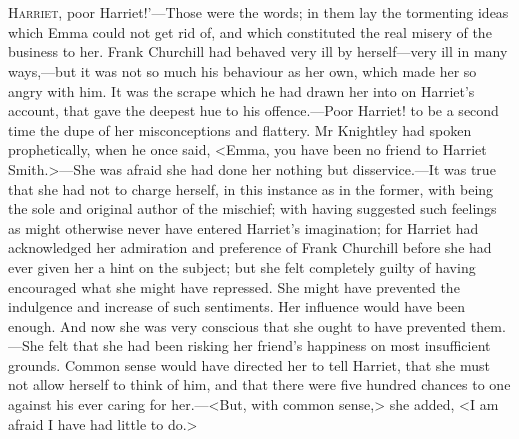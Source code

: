 \chapter[Chapter \thechapter]{}
	\lettrine[lraise=0.3,ante=`]{H}{arriet,} poor Harriet!'—Those were the words; in them lay the tormenting ideas which Emma could not get rid of, and which constituted the real misery of the business to her. Frank Churchill had behaved very ill by herself—very ill in many ways,—but it was not so much his behaviour as her own, which made her so angry with him. It was the scrape which he had drawn her into on Harriet's account, that gave the deepest hue to his offence.—Poor Harriet! to be a second time the dupe of her misconceptions and flattery. Mr Knightley had spoken prophetically, when he once said, <Emma, you have been no friend to Harriet Smith.>—She was afraid she had done her nothing but disservice.—It was true that she had not to charge herself, in this instance as in the former, with being the sole and original author of the mischief; with having suggested such feelings as might otherwise never have entered Harriet's imagination; for Harriet had acknowledged her admiration and preference of Frank Churchill before she had ever given her a hint on the subject; but she felt completely guilty of having encouraged what she might have repressed. She might have prevented the indulgence and increase of such sentiments. Her influence would have been enough. And now she was very conscious that she ought to have prevented them.—She felt that she had been risking her friend's happiness on most insufficient grounds. Common sense would have directed her to tell Harriet, that she must not allow herself to think of him, and that there were five hundred chances to one against his ever caring for her.—<But, with common sense,> she added, <I am afraid I have had little to do.>

